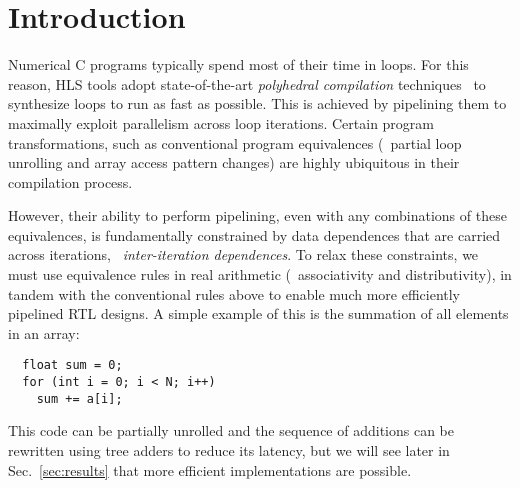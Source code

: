 \section{Introduction}
\label{sec:introduction}


Numerical C programs typically spend most of their time in loops.  For this
reason, HLS tools adopt state-of-the-art \emph{polyhedral compilation}
techniques~\cite{canis14} to synthesize loops to run as fast as possible.  This
is achieved by pipelining them to maximally exploit parallelism across loop
iterations.  Certain program transformations, such as conventional program
equivalences (\eg~partial loop unrolling and array access pattern changes) are
highly ubiquitous in their compilation process.

However, their ability to perform pipelining, even with any combinations of
these equivalences, is fundamentally constrained by data dependences that
are carried across iterations, \ie~\emph{inter-iteration dependences}.  To
relax these constraints, we must use equivalence rules in real arithmetic
(\eg~associativity and distributivity), in tandem with the conventional rules
above to enable much more efficiently pipelined RTL designs.  A simple example
of this is the summation of all elements in an array:
\begin{lstlisting}
  float sum = 0;
  for (int i = 0; i < N; i++)
    sum += a[i];
\end{lstlisting}
This code can be partially unrolled and the sequence of additions can be
rewritten using tree adders to reduce its latency, but we will see later in
Sec.~\ref{sec:results} that more efficient implementations are possible.


